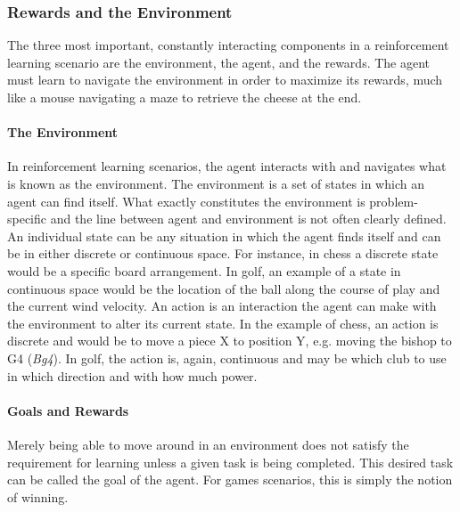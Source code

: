 \subsubsection*{Rewards and the Environment}


The three most important, constantly interacting components in a reinforcement
learning scenario are
the environment, the agent, and the rewards.
%
The agent must learn to navigate the environment in order to maximize its
rewards,
much like a mouse navigating a maze to retrieve the cheese at the end.

\paragraph*{The Environment}

In reinforcement learning scenarios,
the agent interacts with and navigates what is known as the environment.
%
The environment is a set of states in which an agent can find itself.
%
What exactly constitutes the environment is problem-specific
and the line between agent and environment is not often clearly defined.
%
An individual state can be any situation in which the agent finds itself
and can be in either discrete or continuous space.
%
For instance, in chess a discrete state would be a specific board arrangement.
%
In golf, an example of a state in continuous space would be 
the location of the ball along the course of play
and the current wind velocity.
%
An action is an interaction the agent can make with the environment to alter
its current state.
%
In the example of chess,
an action is discrete and would be to move a piece X to position Y,
e.g. moving the bishop to G4 (\textit{Bg4}).
%
In golf, the action is, again, continuous and may be
which club to use in which direction and with how much power.

\paragraph*{Goals and Rewards}

Merely being able to move around in an environment does not satisfy the
requirement for learning unless a given task is being completed.
%
This desired task can be called the goal of the agent.
%
For games scenarios,
this is simply the notion of winning.

